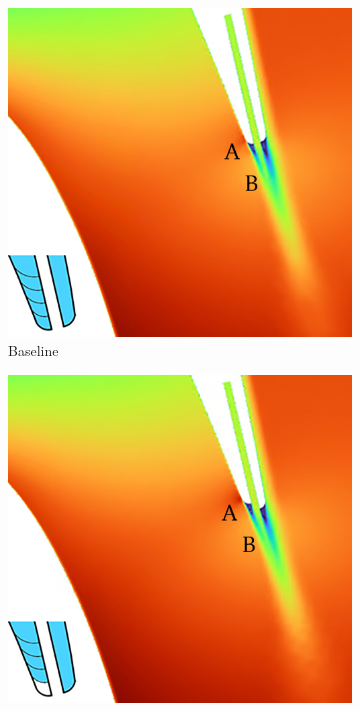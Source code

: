 \documentclass[a4paper, 11pt, oneside]{report}
\begin{document}
\begin{figure}[H]
	\centering
	\begin{subfigure}{.42\textwidth}
		\centering
		\includegraphics[width=\linewidth]{figs/ps_cutbacks_design_0_ver02.png}
		\caption{Baseline}
		\vspace{0.018\textheight}
	\end{subfigure}
	\hspace{0.05\textwidth}
	\begin{subfigure}{.42\textwidth}
		\centering
		\includegraphics[width=\linewidth]{figs/ps_cutbacks_design_25_ver02.png}

\end{subfigure}
\end{figure}
\end{document}
